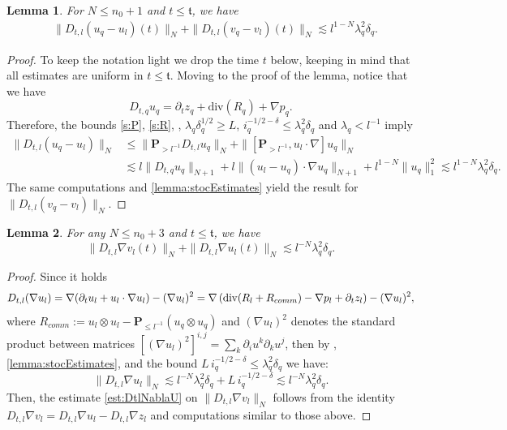 \documentclass[10pt,a4paper]{amsart}
\numberwithin{equation}{section}
\numberwithin{corollario}{section}
\newtheorem{lemma}{Lemma}
\numberwithin{lemma}{section}
\numberwithin{prop}{section}
\theoremstyle{definition}
\theoremstyle{remark}
\newcommand{\dvg}{\mathord{{\rm div}}}
\newcommand{\proj}{\mathbf{P}}
\begin{document}
\begin{lemma}  
    For $N\le n_0+1$ and $t \le\mathfrak{t}$, we have
    \begin{align}
        &\label{est: DtlDiffv}\|D_{t,l}(u_q-u_l)(t)\|_N+\|D_{t,l}(v_q-v_l)(t)\|_N\lesssim l^{1-N}\lambda_q^2\delta_q.
    \end{align}
\end{lemma}
\begin{proof}
   To keep the notation light we drop the time $t$ below, keeping in mind that all estimates are uniform in $t \leq \mathfrak{t}$.
   Moving to the proof of the lemma, notice that we have 
    \[D_{t,q}u_q=\partial_tz_q+\mbox{div}(R_q)+\nabla p_q.\]
    Therefore, the bounds \eqref{s:P}, \eqref{s:R}, \cite[Lemma A.3]{DLK23}, $\lambda_q\delta_q^{1/2}\geq L$, $i_q^{-1/2-\delta}\le \lambda_q^2\delta_q$ and $\lambda_q<l^{-1}$ imply
    \begin{equation}
        \begin{aligned}
            \|D_{t,l}(u_q-u_l)\|_N&\le \|\proj_{>l^{-1}}D_{t,l}u_q\|_N+\|[\proj_{>l^{-1}},u_l\cdot \nabla]u_q\|_N\\
                &\lesssim l \|D_{t,q}u_q\|_{N+1}+l\|(u_l-u_q)\cdot \nabla u_q\|_{N+1}+l^{1-N}\|u_q\|_1^2\lesssim
            l^{1-N}\lambda_q^2\delta_q.
        \end{aligned}
    \end{equation}
    The same computations and \autoref{lemma:stocEstimates} yield the result for $\|D_{t,l}(v_q-v_l)\|_N$.
\end{proof}
\begin{lemma}
    For any $N\le n_0+3$ and $t \le\mathfrak{t}$, we have
    \begin{equation}\label{est:DtlNablaU}
        \|D_{t,l}\nabla v_l(t)\|_N+\|D_{t,l}\nabla u_l(t)\|_N\lesssim l^{-N}\lambda^2_q\delta_q.
    \end{equation} 
\end{lemma}

\begin{proof}
    Since it holds
    \[D_{t,l}(\nabla u_l)=\nabla(\partial_tu_l+u_l\cdot\nabla u_l)-(\nabla u_l)^2=\nabla\left(\dvg(R_l+R_{comm})-\nabla p_l+\partial_t z_l\right)-(\nabla u_l)^2,\] 
    where $R_{comm}:=u_l\otimes u_l-\proj_{\le l^{-1}}(u_q\otimes u_q)$ and $(\nabla u_l)^2$ denotes the standard product between matrices $[(\nabla u_l)^2]^{i,j} = \sum_k \partial_i u^k \partial_k u^j$, then by \cite[Lemma A.3]{DLK23}, \autoref{lemma:stocEstimates}, and the bound $L\,i_q^{-1/2-\delta}\le \lambda^2_q\delta_q$ we have:
    \begin{equation}
        \|D_{t,l}\nabla u_l\|_N\lesssim l^{-N}\lambda^2_q\delta_q+L\,i_q^{-1/2-\delta}\lesssim l^{-N}\lambda^2_q\delta_q.
    \end{equation}
    Then, the estimate \eqref{est:DtlNablaU} on $\|D_{t,l}\nabla v_l\|_N$ follows from the identity $D_{t,l}\nabla v_l=D_{t,l}\nabla u_l-D_{t,l}\nabla z_l$ and computations similar to those above.
\end{proof}
\end{document}
